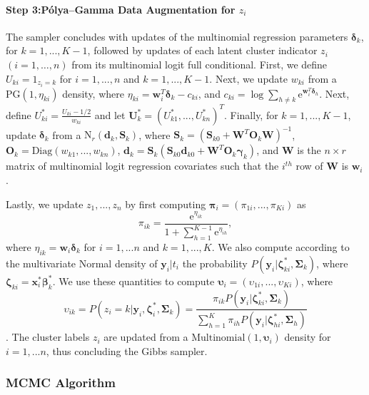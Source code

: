 \documentclass[useAMS,referee]{biom}
\begin{document}
\paragraph{\textbf{Step 3:}P\'olya--Gamma Data Augmentation for $z_i$} The sampler concludes with updates of the multinomial regression parameters $\boldsymbol\delta_k$, for $k = 1,...,K-1$, followed by updates of each latent cluster indicator $z_i$ $(i=1,\ldots,n)$ from its multinomial logit full conditional. First, we define $U_{ki} = {1}_{z_i = k}$ for $i = 1,...,n$ and $k = 1,...,K-1$. Next, we update ${w}_{ki}$ from a $\text{PG}(1,\eta_{ki})$ density, where $\eta_{ki} = \mathbf{w}_i^T \boldsymbol\delta_k - {c}_{ki}$, and ${c}_{ki} = \log \sum_{h \ne k} \text{e}^{\mathbf{w}_i^T \boldsymbol\delta_{h}}$. Next, define $U^*_{ki} = \frac{U_{ki} - 1/2}{{w}_{ki}}$ and let $\mathbf{U}^*_k = (U^*_{k1},...,U^*_{kn})^T$. Finally, for $k = 1,...,K-1$, update $\boldsymbol\delta_k$ from a $\text{N}_r(\mathbf{d}_k,\mathbf{S}_k)$, where $\mathbf{S}_k = (\mathbf{S}_{k0} + \mathbf{W}^T \mathbf{O}_k \mathbf{W})^{-1}$, $\mathbf{O}_k = \text{Diag}({w}_{k1},...,{w}_{kn})$,  $\mathbf{d}_k = \mathbf{S}_k (\mathbf{S}_{k0}\mathbf{d}_{k0} + \mathbf{W}^T \mathbf{O}_k \boldsymbol\gamma_k)$, and $\mathbf{W}$ is the $n \times r$ matrix of multinomial logit regression covariates such that the $i^{th}$ row of $\mathbf{W}$ is $\mathbf{w}_i$.

Lastly, we update $z_1,...,z_n$ by first computing $\boldsymbol\pi_i = (\pi_{1i},...,\pi_{Ki})$ as
$$\pi_{ik} = \frac{\text{e}^{\eta_{ik}}}{1 + \sum_{h=1}^{K-1} \text{e}^{\eta_{ih}}},$$ 
where $\eta_{ik} = \mathbf{w}_i\boldsymbol\delta_k$ for $i = 1,...n$ and $k = 1,...,K$. We also compute according to the multivariate Normal density of $\mathbf{y}_i|t_i$ the probability $P(\mathbf{y}_i|\boldsymbol\zeta^*_{ki},\boldsymbol\Sigma_k)$, where $\boldsymbol\zeta_{ki} = \mathbf{x}_i^*\boldsymbol\beta^*_k$. We use these quantities to compute $\boldsymbol\upsilon_{i} = (\upsilon_{1i},...,\upsilon_{Ki})$, where  
$$\upsilon_{ik} = P(z_i = k|\mathbf{y}_i,\boldsymbol\zeta^*_i,\boldsymbol\Sigma_k) = \frac{\pi_{ik}P(\mathbf{y}_i|\boldsymbol\zeta^*_{ki},\boldsymbol\Sigma_k)}{\sum_{h = 1}^{K} \pi_{ih}P(\mathbf{y}_i|\boldsymbol\zeta^*_{hi},\boldsymbol\Sigma_h)}$$.
The cluster labels $z_i$ are updated from a $\text{Multinomial}(1,\boldsymbol\upsilon_i)$ density for $i = 1,...n$, thus concluding the Gibbs sampler.


\subsubsection{MCMC Algorithm}
\end{document}
